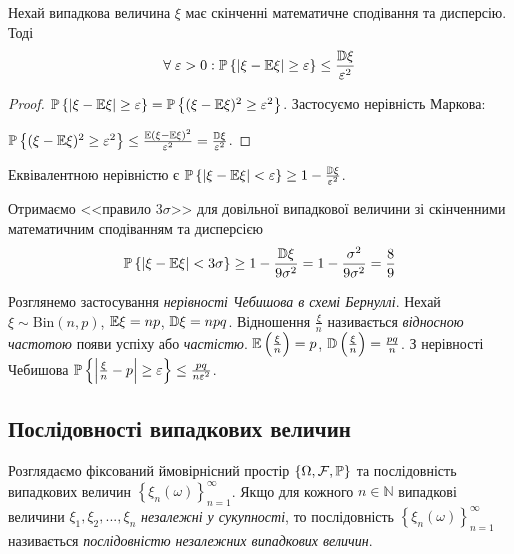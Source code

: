 \begin{proposition*}
    Нехай випадкова величина $\xi$ має скінченні математичне сподівання та дисперсію.
Тоді
\begin{gather}\label{Cheb_ineq}
    \forall \; \varepsilon >0 : \P\left\{ \left|\xi - \E\xi\right| \geq \varepsilon\right\} \leq \frac{\D\xi}{\varepsilon^2}
\end{gather}
\end{proposition*} 
\begin{proof}
    $\P\left\{ |\xi - \E\xi| \geq \varepsilon\right\} = \P\left\{ (\xi - \E\xi)^2 \geq \varepsilon^2\right\}$.
    Застосуємо нерівність Маркова:
    
    \noindent $\P\left\{ (\xi - \E\xi)^2 \geq \varepsilon^2\right\} \leq \frac{\E(\xi - \E\xi)^2}{\varepsilon^2} = \frac{\D\xi}{\varepsilon^2}$.
\end{proof}
\begin{remark}
    Еквівалентною нерівністю є $\P\left\{ \left|\xi - \E\xi\right| < \varepsilon\right\} \geq 1 - \frac{\D\xi}{\varepsilon^2}$.
\end{remark}
\begin{example}
    Отримаємо <<правило $3 \sigma$>> для довільної випадкової величини зі скінченними математичним сподіванням та дисперсією
    $$\P\left\{ |\xi - \E\xi| < 3 \sigma\right\} \geq 1 - \frac{\D\xi}{9 \sigma^2} = 1 - \frac{\sigma^2}{9 \sigma^2} = \frac{8}{9}$$
\end{example}
Розглянемо застосування \emph{нерівності Чебишова в схемі Бернуллі}. Нехай $\xi \sim \mathrm{Bin}(n, p)$, $\E\xi = np$, $\D\xi = npq$.
Відношення $\frac{\xi}{n}$ називається \emph{відносною частотою} появи успіху або \emph{частістю}. $\E\left( \frac{\xi}{n}\right) = p$, 
$\D\left( \frac{\xi}{n}\right) = \frac{pq}{n}$. З нерівності Чебишова 
$\P\left\{ \left|\frac{\xi}{n} - p\right| \geq \varepsilon\right\} \leq \frac{pq}{n \varepsilon^2}$.

\subsection{Послідовності випадкових величин}
Розглядаємо фіксований ймовірнісний простір $\left\{ \Omega, \mathcal{F}, \P\right\}$ та
послідовність випадкових величин $\left\{ \xi_n (\omega)\right\}_{n=1}^{\infty}$.
Якщо для кожного $n \in \mathbb{N}$ випадкові величини $\xi_1, \xi_2, ..., \xi_n$ \emph{незалежні у сукупності},
то послідовність $\left\{ \xi_n (\omega)\right\}_{n=1}^{\infty}$ називається \emph{послідовністю незалежних випадкових величин}.

